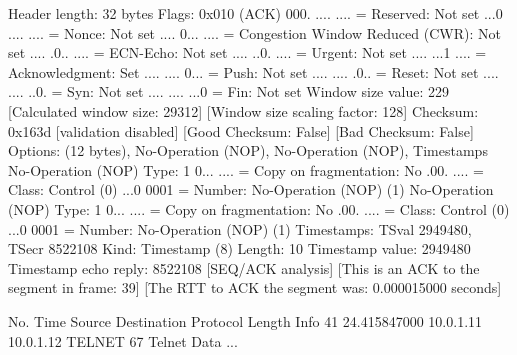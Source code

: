     Header length: 32 bytes
    Flags: 0x010 (ACK)
        000. .... .... = Reserved: Not set
        ...0 .... .... = Nonce: Not set
        .... 0... .... = Congestion Window Reduced (CWR): Not set
        .... .0.. .... = ECN-Echo: Not set
        .... ..0. .... = Urgent: Not set
        .... ...1 .... = Acknowledgment: Set
        .... .... 0... = Push: Not set
        .... .... .0.. = Reset: Not set
        .... .... ..0. = Syn: Not set
        .... .... ...0 = Fin: Not set
    Window size value: 229
    [Calculated window size: 29312]
    [Window size scaling factor: 128]
    Checksum: 0x163d [validation disabled]
        [Good Checksum: False]
        [Bad Checksum: False]
    Options: (12 bytes), No-Operation (NOP), No-Operation (NOP), Timestamps
        No-Operation (NOP)
            Type: 1
                0... .... = Copy on fragmentation: No
                .00. .... = Class: Control (0)
                ...0 0001 = Number: No-Operation (NOP) (1)
        No-Operation (NOP)
            Type: 1
                0... .... = Copy on fragmentation: No
                .00. .... = Class: Control (0)
                ...0 0001 = Number: No-Operation (NOP) (1)
        Timestamps: TSval 2949480, TSecr 8522108
            Kind: Timestamp (8)
            Length: 10
            Timestamp value: 2949480
            Timestamp echo reply: 8522108
    [SEQ/ACK analysis]
        [This is an ACK to the segment in frame: 39]
        [The RTT to ACK the segment was: 0.000015000 seconds]

No.     Time           Source                Destination           Protocol Length Info
     41 24.415847000   10.0.1.11             10.0.1.12             TELNET   67     Telnet Data ...

